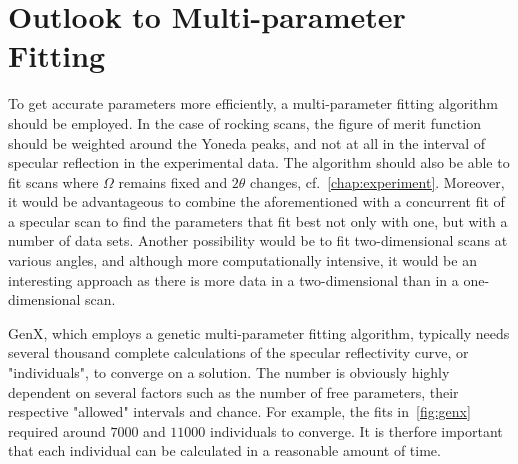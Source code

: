 \documentclass[10pt,twoside, b5paper,pdftex]{report}
\newcommand{\linec}[0]{\begin{center}\line(1,0){200}\end{center}\vspace{0.15cm}}
\begin{document}
\newpage
\section{Outlook to Multi-parameter Fitting}
To get accurate parameters more efficiently, a multi-parameter fitting algorithm should be employed.%
In the case of rocking scans, the figure of merit function should be weighted around the Yoneda peaks, and not at all in the interval of specular reflection in the experimental data. %
The algorithm should also be able to fit scans where $\Omega$ remains fixed and $2\theta$ changes, cf.~\cref{chap:experiment}. Moreover, it would be advantageous to combine the aforementioned with a concurrent fit of a specular scan to find the parameters that fit best not only with one, but with a number of data sets. Another possibility would be to fit two-dimensional scans at various angles, and although more computationally intensive, it would be an interesting approach as there is more data in a two-dimensional  than in a one-dimensional scan. 

GenX, which employs a genetic  multi-parameter fitting algorithm, typically needs several thousand complete calculations of the specular reflectivity curve, or "individuals", to converge on a solution. The number is obviously highly dependent on several factors such as the number of free parameters, their respective "allowed" intervals and chance. For example, the fits in~\cref{fig:genx} required around $7000$ and $11000$ individuals to converge. It is therfore important that each individual can be calculated in a reasonable amount of time.
 
\end{document}
